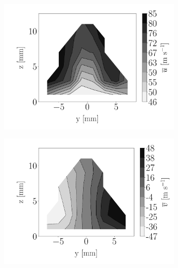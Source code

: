 \begin{figure}[h!]
\begin{subfigure}[b]{0.3\textwidth}
	\centering
   \includegraphics[scale=\scaleSLIJICF]{./part2_developments/figures_ch5_resolved_JICF/injectors_SLI/uG100_dx10_x10_ux_mean_map}
\end{subfigure}
   \hspace{0.17in}
\begin{subfigure}[b]{0.3\textwidth}
	\centering
   \includegraphics[scale=\scaleSLIJICF]{./part2_developments/figures_ch5_resolved_JICF/injectors_SLI/uG100_dx10_x10_uy_mean_map}
\end{subfigure}
   \hspace{0.17in}

\end{figure}
